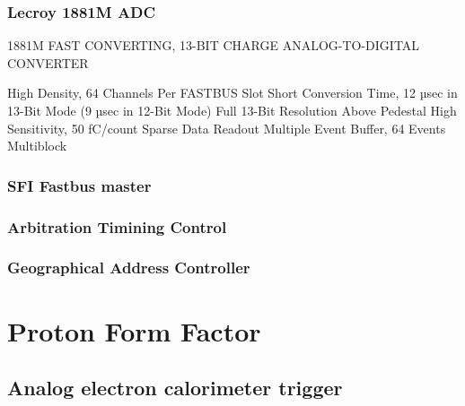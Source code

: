 \documentclass{article}
\begin{document}
    \subsubsection{Lecroy 1881M ADC}
1881M FAST CONVERTING, 13-BIT CHARGE ANALOG-TO-DIGITAL CONVERTER

    High Density, 64 Channels Per FASTBUS Slot
    Short Conversion Time, 12 µsec in 13-Bit Mode (9 µsec in 12-Bit Mode)
    Full 13-Bit Resolution Above Pedestal
    High Sensitivity, 50 fC/count
    Sparse Data Readout
    Multiple Event Buffer, 64 Events
    Multiblock 
    
\subsubsection{SFI Fastbus master}


\subsubsection{Arbitration Timining Control}
\subsubsection{Geographical Address Controller} 

\section {Proton Form Factor}
\subsection {Analog electron calorimeter trigger}
\end{document}
